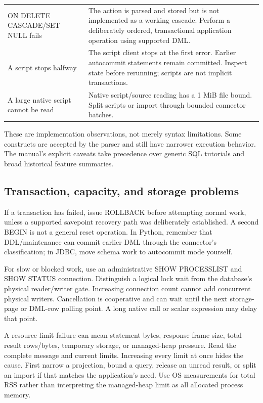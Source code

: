 \begin{longtable}{p{.3\linewidth}p{.61\linewidth}}
ON DELETE CASCADE/SET NULL fails & The action is parsed and stored but is not implemented as a working cascade. Perform a deliberately ordered, transactional application operation using supported DML. \\
A script stops halfway & The script client stops at the first error. Earlier autocommit statements remain committed. Inspect state before rerunning; scripts are not implicit transactions. \\
A large native script cannot be read & Native script/source reading has a 1 MiB file bound. Split scripts or import through bounded connector batches. \\
\bottomrule
\end{longtable}

These are implementation observations, not merely syntax limitations. Some constructs are accepted by the parser and still have narrower execution behavior. The manual's explicit caveats take precedence over generic SQL tutorials and broad historical feature summaries.

\subsection{Transaction, capacity, and storage problems}

If a transaction has failed, issue ROLLBACK before attempting normal work, unless a supported savepoint recovery path was deliberately established. A second BEGIN is not a general reset operation. In Python, remember that DDL/maintenance can commit earlier DML through the connector's classification; in JDBC, move schema work to autocommit mode yourself.

For slow or blocked work, use an administrative SHOW PROCESSLIST and SHOW STATUS connection. Distinguish a logical lock wait from the database's physical reader/writer gate. Increasing connection count cannot add concurrent physical writers. Cancellation is cooperative and can wait until the next storage-page or DML-row polling point. A long native call or scalar expression may delay that point.

A resource-limit failure can mean statement bytes, response frame size, total result rows/bytes, temporary storage, or managed-heap pressure. Read the complete message and current limits. Increasing every limit at once hides the cause. First narrow a projection, bound a query, release an unread result, or split an import if that matches the application's need. Use OS measurements for total RSS rather than interpreting the managed-heap limit as all allocated process memory.

